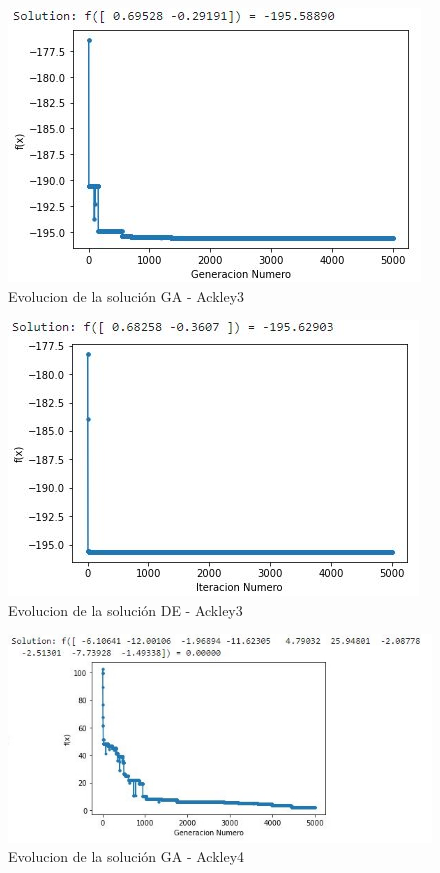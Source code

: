 \documentclass[10pt]{article}
\begin{document}
\begin{figure}[H]
\centerline{\includegraphics{ack-3-ga.jpg}}
\caption{Evolucion de la solución GA - Ackley3}
\label{fig_1}
\end{figure}

\begin{figure}[H]
\centerline{\includegraphics{ack-3-de.jpg}}
\caption{Evolucion de la solución DE - Ackley3}
\label{fig_1}
\end{figure}

\begin{figure}[H]
\centerline{\includegraphics{ack-4-ga.jpg}}
\caption{Evolucion de la solución GA - Ackley4}
\label{fig_1}
\end{figure}
\end{document}
